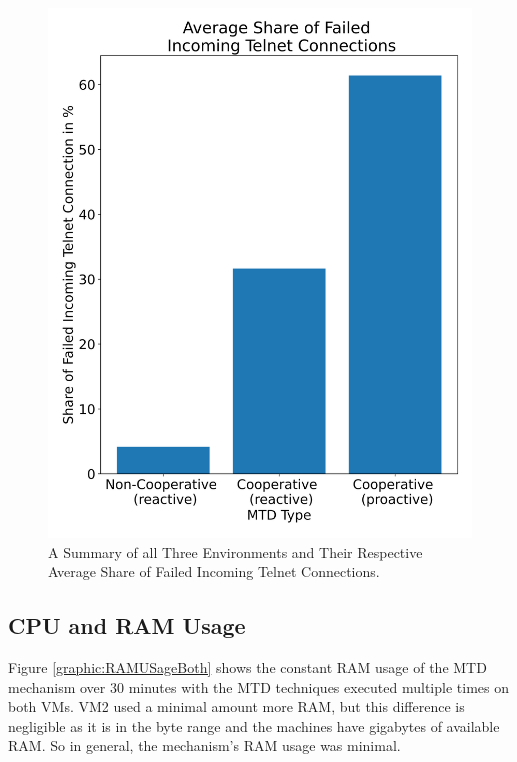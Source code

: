 \begin{figure}[tph]
\includegraphics[scale=0.4]{assets/telnetToLocalSummary.png}
\centering
\caption{A Summary of all Three Environments and Their Respective Average Share of Failed Incoming Telnet Connections.}
\label{graphic:telnetToLocalSummary}
\end{figure}



\subsection{CPU and RAM Usage}

Figure \ref{graphic:RAMUSageBoth} shows the constant RAM usage of the MTD mechanism over 30 minutes with the MTD techniques executed multiple times on both VMs. VM2 used a minimal amount more RAM, but this difference is negligible as it is in the byte range and the machines have gigabytes of available RAM. So in general, the mechanism's RAM usage was minimal.  


